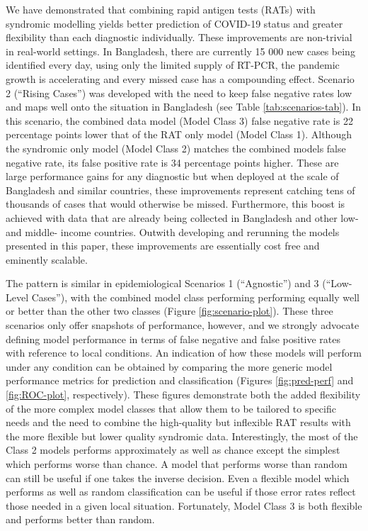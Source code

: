 \documentclass[]{elsarticle} %
\begin{document}
We have demonstrated that combining rapid antigen tests (RATs) with syndromic modelling yields better prediction of COVID-19 status and greater flexibility than each diagnostic individually.
These improvements are non-trivial in real-world settings.
In Bangladesh, there are currently 15 000 new cases being identified every day, using only the limited supply of RT-PCR, the pandemic growth is accelerating and every missed case has a compounding effect.
Scenario 2 (``Rising Cases'') was developed with the need to keep false negative rates low and maps well onto the situation in Bangladesh (see Table \ref{tab:scenarios-tab}).
In this scenario, the combined data model (Model Class 3) false negative rate is
22 percentage points lower that of the RAT only model (Model Class 1).
Although the syndromic only model (Model Class 2) matches the combined models false negative rate, its false positive rate is
34 percentage points higher.
These are large performance gains for any diagnostic but when deployed at the scale of Bangladesh and similar countries, these improvements represent catching tens of thousands of cases that would otherwise be missed.
Furthermore, this boost is achieved with data that are already being collected in Bangladesh and other low- and middle- income countries.
Outwith developing and rerunning the models presented in this paper, these improvements are essentially cost free and eminently scalable.

The pattern is similar in epidemiological Scenarios 1 (``Agnostic'') and 3 (``Low-Level Cases''), with the combined model class performing performing equally well or better than the other two classes (Figure \ref{fig:scenario-plot}).
These three scenarios only offer snapshots of performance, however, and we strongly advocate defining model performance in terms of false negative and false positive rates with reference to local conditions.
An indication of how these models will perform under any condition can be obtained by comparing the more generic model performance metrics for prediction and classification (Figures \ref{fig:pred-perf} and \ref{fig:ROC-plot}, respectively).
These figures demonstrate both the added flexibility of the more complex model classes that allow them to be tailored to specific needs and the need to combine the high-quality but inflexible RAT results with the more flexible but lower quality syndromic data.
Interestingly, the most of the Class 2 models performs approximately as well as chance except the simplest which performs worse than chance.
A model that performs worse than random can still be useful if one takes the inverse decision. 
Even a flexible model which performs as well as random classification can be useful if those error rates reflect those needed in a given local situation.
Fortunately, Model Class 3 is both flexible and performs better than random.
\end{document}
